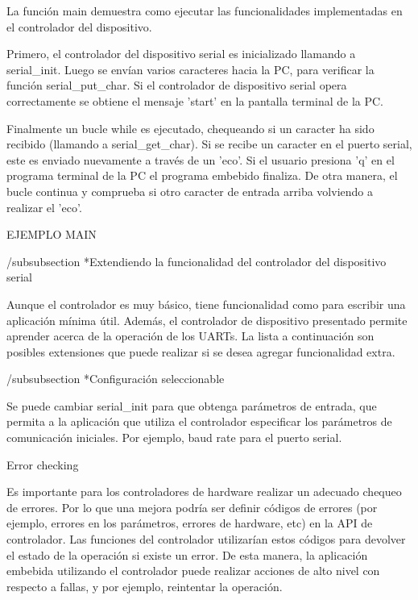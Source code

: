 \documentclass[12pt]{article}
\begin{document}
La función main demuestra como ejecutar las funcionalidades implementadas
en el controlador del dispositivo.

Primero, el controlador del dispositivo serial es inicializado llamando 
a serial\_init. Luego se envían varios caracteres hacia la PC, para 
verificar la función serial\_put\_char. Si el controlador de dispositivo serial
opera correctamente se obtiene el mensaje 'start' en la pantalla terminal
de la PC.

Finalmente un bucle while es ejecutado, chequeando si un caracter
ha sido recibido (llamando a serial\_get\_char). Si se recibe un caracter
en el puerto serial, este es enviado nuevamente a través de un 'eco'.
Si el usuario presiona 'q' en el programa terminal de la PC el programa
embebido finaliza. De otra manera, el bucle continua y comprueba si otro
caracter de entrada arriba volviendo a realizar el 'eco'.



EJEMPLO MAIN


/subsubsection *{Extendiendo la funcionalidad del controlador del dispositivo serial}


Aunque el controlador es muy básico, tiene funcionalidad como para
escribir una aplicación mínima útil.
Además, el controlador de dispositivo 
presentado permite  aprender acerca de la operación de los UARTs.
La lista a continuación son posibles extensiones que puede realizar
si se desea agregar funcionalidad extra.


/subsubsection *{Configuración seleccionable}

Se puede cambiar serial\_init para que obtenga parámetros de entrada,
que permita a la aplicación que utiliza el controlador especificar
los parámetros de comunicación iniciales. Por ejemplo, baud rate para
el puerto serial.

Error checking

Es importante para los controladores de hardware realizar un adecuado
chequeo de errores. Por lo que una mejora podría ser definir códigos
de errores (por ejemplo, errores en los parámetros, errores de hardware, etc)
en la API de controlador.
Las funciones del controlador utilizarían estos códigos para devolver
el estado de la operación si existe un error. De esta manera, la aplicación embebida
utilizando el controlador puede realizar acciones de alto nivel con respecto
a fallas, y por ejemplo, reintentar la operación.
\end{document}
